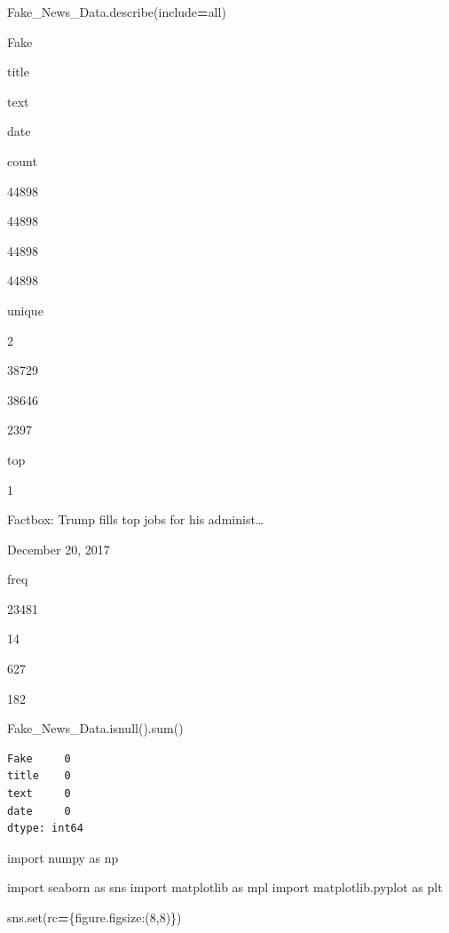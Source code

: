 \documentclass[
  11pt,
  a4paper,
]{article}
\newenvironment{Shaded}{\begin{snugshade}}{\end{snugshade}}
\newcommand{\BuiltInTok}[1]{#1}
\newcommand{\DecValTok}[1]{\textcolor[rgb]{0.00,0.00,0.81}{#1}}
\newcommand{\ImportTok}[1]{#1}
\newcommand{\NormalTok}[1]{#1}
\newcommand{\OperatorTok}[1]{\textcolor[rgb]{0.81,0.36,0.00}{\textbf{#1}}}
\newcommand{\StringTok}[1]{\textcolor[rgb]{0.31,0.60,0.02}{#1}}
\begin{document}
\begin{Shaded}
\begin{Highlighting}[]
\NormalTok{Fake\_News\_Data.describe(include}\OperatorTok{=}\StringTok{\textquotesingle{}all\textquotesingle{}}\NormalTok{)}
\end{Highlighting}
\end{Shaded}

Fake

title

text

date

count

44898

44898

44898

44898

unique

2

38729

38646

2397

top

1

Factbox: Trump fills top jobs for his administ\ldots{}

December 20, 2017

freq

23481

14

627

182

\begin{Shaded}
\begin{Highlighting}[]
\NormalTok{Fake\_News\_Data.isnull().}\BuiltInTok{sum}\NormalTok{()}
\end{Highlighting}
\end{Shaded}

\begin{verbatim}
Fake     0
title    0
text     0
date     0
dtype: int64
\end{verbatim}

\begin{Shaded}
\begin{Highlighting}[]
\ImportTok{import}\NormalTok{ numpy }\ImportTok{as}\NormalTok{ np}

\ImportTok{import}\NormalTok{ seaborn }\ImportTok{as}\NormalTok{ sns}
\ImportTok{import}\NormalTok{ matplotlib }\ImportTok{as}\NormalTok{ mpl}
\ImportTok{import}\NormalTok{ matplotlib.pyplot }\ImportTok{as}\NormalTok{ plt}

\NormalTok{sns.}\BuiltInTok{set}\NormalTok{(rc}\OperatorTok{=}\NormalTok{\{}\StringTok{\textquotesingle{}figure.figsize\textquotesingle{}}\NormalTok{:(}\DecValTok{8}\NormalTok{,}\DecValTok{8}\NormalTok{)\})}
\end{Highlighting}
\end{Shaded}
\end{document}
